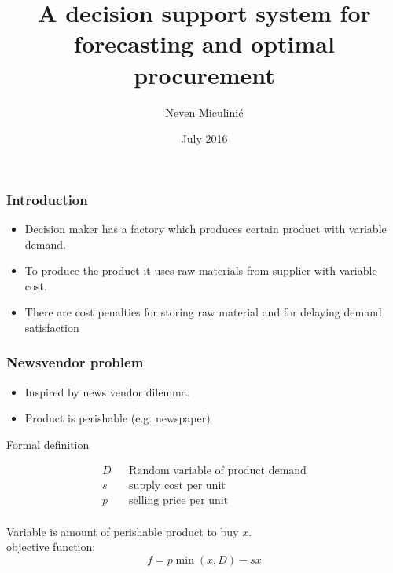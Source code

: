 \documentclass{beamer}
\title{A decision support system for forecasting and optimal procurement}
\author{Neven Miculinić}
\date{July 2016}
\begin{document}
\frame{\titlepage}


\begin{frame}
\frametitle{Introduction}
\begin{itemize}
\item Decision maker has a factory which produces certain product with variable demand.
\item To produce the product it uses raw materials from supplier with variable cost.
\item There are cost penalties for storing raw material and for delaying demand satisfaction
\end{itemize}




\end{frame}


\begin{frame}
    \frametitle{Newsvendor problem}
    \begin{itemize}
        \item Inspired by news vendor dilemma.
        \item Product is perishable (e.g. newspaper)
    \end{itemize}

    \begin{block}{Formal definition}

        \begin{align*}
            D && \text{Random variable of product demand} \\
            s && \text{supply cost per unit} \\
            p && \text{selling price per unit} \\
        \end{align*}

        Variable is amount of perishable product to buy $x$.\\
        objective function:
        \begin{equation*}
            f = p\min(x, D) - sx
        \end{equation*}

    \end{block}
\end{frame}
\end{document}
